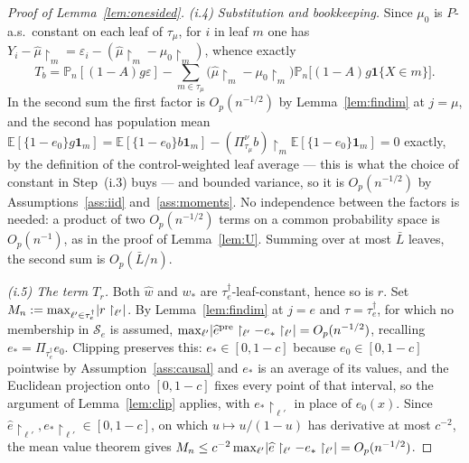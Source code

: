 \documentclass[11pt]{article}
\theoremstyle{plain}
\theoremstyle{definition}
\theoremstyle{remark}
\newcommand{\E}{\mathbb{E}}
\newcommand{\Pn}{\mathbb{P}_n}
\newcommand{\cS}{\mathcal{S}}
\newcommand{\ez}{e_0}
\newcommand{\mz}{\mu_0}
\newcommand{\ehat}{\widehat{e}}
\newcommand{\mhat}{\widehat{\mu}}
\newcommand{\what}{\widehat{w}}
\DeclarePairedDelimiter{\abs}{\lvert}{\rvert}
\begin{document}
\begin{proof}[Proof of Lemma~\ref{lem:onesided}]
\emph{(i.4) Substitution and bookkeeping.} Since $\mz$ is $P$-a.s.\ constant on
each leaf of $\tau_\mu$, for $i$ in leaf $m$ one has
$Y_i-\mhat\restriction_m=\varepsilon_i
-(\mhat\restriction_m-\mz\restriction_m)$, whence exactly
\[
  T_b=\Pn[(1-A)g\varepsilon]
   -\sum_{m\in\tau_\mu}\bigl(\mhat\restriction_m-\mz\restriction_m\bigr)
    \Pn\bigl[(1-A)g\mathbf1\{X\in m\}\bigr].
\]
In the second sum the first factor is $O_p(n^{-1/2})$ by Lemma~\ref{lem:findim}
at $j=\mu$, and the second has population mean
$\E[\{1-\ez\}g\mathbf1_m]
=\E[\{1-\ez\}b\mathbf1_m]-(\Pi^\nu_{\tau_\mu}b)\restriction_m
 \E[\{1-\ez\}\mathbf1_m]=0$ exactly, by the definition of the control-weighted
leaf average --- this is what the choice of constant in Step~(i.3) buys --- and
bounded variance, so it is $O_p(n^{-1/2})$ by
Assumptions~\ref{ass:iid} and~\ref{ass:moments}. No independence between the
factors is needed: a product of two $O_p(n^{-1/2})$ terms on a common
probability space is $O_p(n^{-1})$, as in the proof of Lemma~\ref{lem:U}.
Summing over at most $\bar L$ leaves, the second sum is $O_p(\bar L/n)$.

\emph{(i.5) The term $T_r$.} Both $\what$ and $w_*$ are
$\tau^\dagger_e$-leaf-constant, hence so is $r$. Set
$M_n:=\max_{\ell'\in\tau^\dagger_e}\abs{r\restriction_{\ell'}}$. By
Lemma~\ref{lem:findim} at $j=e$ and $\tau=\tau^\dagger_e$, for which no
membership in $\cS_e$ is assumed,
$\max_{\ell'}\abs{\ehat^{\mathrm{pre}}\restriction_{\ell'}
-e_*\restriction_{\ell'}}=O_p(n^{-1/2})$, recalling
$e_*=\Pi_{\tau^\dagger_e}\ez$. Clipping preserves this: $e_*\in[0,1-c]$ because
$\ez\in[0,1-c]$ pointwise by Assumption~\ref{ass:causal} and $e_*$ is an average of
its values, and the Euclidean projection onto $[0,1-c]$ fixes every point of that
interval, so the argument of Lemma~\ref{lem:clip} applies, with
$e_*\restriction_{\ell'}$ in place of $\ez(x)$. Since
$\ehat\restriction_{\ell'},e_*\restriction_{\ell'}\in[0,1-c]$, on which
$u\mapsto u/(1-u)$ has derivative at most $c^{-2}$, the mean value theorem gives
$M_n\le c^{-2}\max_{\ell'}\abs{\ehat\restriction_{\ell'}
-e_*\restriction_{\ell'}}=O_p(n^{-1/2})$.


\end{proof}
\end{document}
